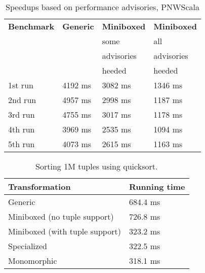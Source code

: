 \begin{table}[t!]

  \centering
  \begin{tabularx}{0.98\textwidth}{|g *{3}{|Y}|} \hline
    \textbf{Benchmark} & \textbf{Generic}      & \textbf{Miniboxed}     & \textbf{Miniboxed} \\
        &                       &  some                  &  all               \\
        &                       &  advisories            &  advisories        \\
        &                       &  heeded                &  heeded            \\ \hline
    1st run            &               4192 ms &               3082 ms &             1346 ms \\
    2nd run            &               4957 ms &               2998 ms &             1187 ms \\
    3rd run            &               4755 ms &               3017 ms &             1178 ms \\
    4th run            &               3969 ms &               2535 ms &             1094 ms \\
    5th run            &               4073 ms &               2615 ms &             1163 ms \\ \hline
  \end{tabularx}

  \caption{Speedups based on performance advisories, PNWScala}
  \label{mbox2:table:pureimage}

\end{table}


\begin{table}[b!]
  \begin{tabularx}{0.98\textwidth}{|g *{1}{|Y}|} \hline
    \textbf{Transformation} & \textbf{Running time}  \\ \hline
    Generic                        &              684.4 ms  \\
    Miniboxed (no tuple support)   &              726.8 ms  \\
    Miniboxed (with tuple support) &              323.2 ms  \\
    Specialized                    &              322.5 ms  \\
    Monomorphic                    &              318.1 ms  \\ \hline
  \end{tabularx}

  \caption{Sorting 1M tuples using quicksort.}
  \label{mbox2:table:tuple}

\end{table}

